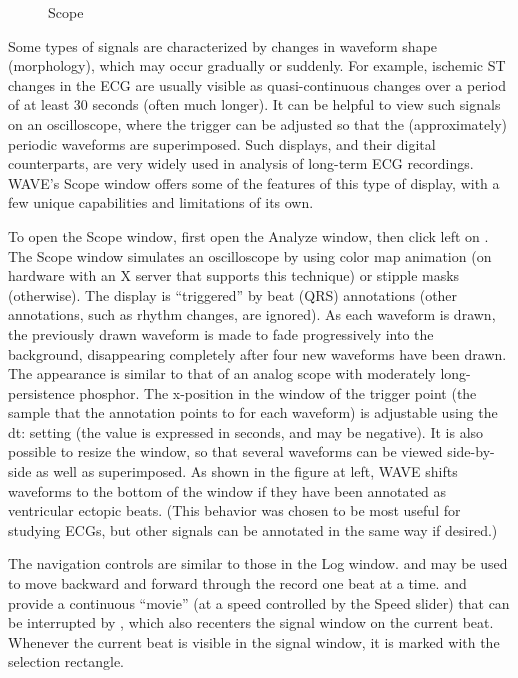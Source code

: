 \documentclass[twoside]{book}
\newcommand{\button}[1]{\cornersize{2}\ovalbox{\rule[-.3mm]{0cm}{2.5mm}\small\sf ~#1~}}
\newcommand{\WAVE}{{\sf WAVE}\xspace}
\begin{document}
\begin{wrapfigure}{l}{2cm}
\mbox{}
\caption[The {\sf Scope} window.]{\sf Scope}
\end{wrapfigure}
Some types of signals are characterized by changes in waveform shape
(morphology), which may occur gradually or suddenly.  For example,
ischemic ST changes in the ECG are usually visible as quasi-continuous
changes over a period of at least 30 seconds (often much longer).  It
can be helpful to view such signals on an oscilloscope, where the
trigger can be adjusted so that the (approximately) periodic waveforms
are superimposed.  Such displays, and their digital counterparts, are
very widely used in analysis of long-term ECG recordings.  \WAVE{}'s
{\sf Scope} window offers some of the features of this type of
display, with a few unique capabilities and limitations of its own.

To open the {\sf Scope} window, first open the {\sf Analyze} window,
then click left on \button{Show scope window}.
The {\sf Scope} window simulates an oscilloscope by using color map
animation (on hardware with an X server that supports this technique)
or stipple masks (otherwise).  The display is ``triggered'' by beat
(QRS) annotations (other annotations, such as rhythm changes, are
ignored).  As each waveform is drawn, the previously drawn waveform is
made to fade progressively into the background, disappearing
completely after four new waveforms have been drawn.  The appearance
is similar to that of an analog scope with moderately long-persistence
phosphor.  The x-position in the window of the trigger point (the
sample that the annotation points to for each waveform) is adjustable
using the {\sf dt:} setting (the value is expressed in seconds, and
may be negative).  It is also possible to resize the window, so that
several waveforms can be viewed side-by-side as well as superimposed.
As shown in the figure at left, \WAVE{} shifts waveforms to the bottom
of the window if they have been annotated as ventricular ectopic
beats.  (This behavior was chosen to be most useful for studying ECGs,
but other signals can be annotated in the same way if desired.)

The navigation controls are similar to those in the {\sf Log} window.
\button{\tt <} and \button{\tt >} may be used to move backward and
forward through the record one beat at a time.  \button{\tt <<} and
\button{\tt >>} provide a continuous ``movie'' (at a speed controlled
by the {\sf Speed} slider) that can be interrupted by \button{Pause},
which also recenters the signal window on the current beat.  Whenever
the current beat is visible in the signal window, it is marked with
the selection rectangle.
\end{document}
